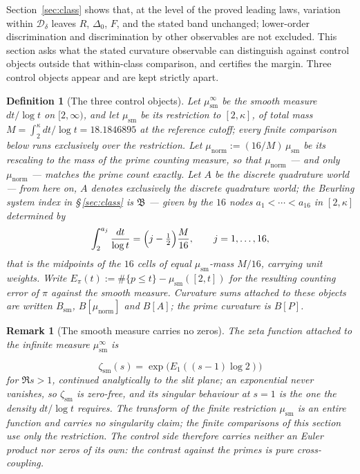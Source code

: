 \documentclass[11pt]{article}
\newtheorem{definition}[theorem]{Definition}
\newtheorem*{remark}{Remark}
\newcommand{\Dclass}{\mathcal{D}_\delta}        %
\newcommand{\Bsm}{B_{\mathrm{sm}}}              %
\begin{document}
Section~\ref{sec:class} shows that, at the level of the proved leading
laws, variation within $\Dclass$ leaves $R$, $\Delta_0$, $F$, and the
stated band unchanged; lower-order discrimination and discrimination by
other observables are not excluded. This section asks what the stated
curvature observable can distinguish against control objects outside that
within-class comparison, and certifies the margin. Three control objects appear and are
kept strictly apart.

\begin{definition}[The three control objects]
\label{def:controls}
Let $\mu_{\mathrm{sm}}^{\infty}$ be the smooth measure $dt/\log t$ on
$[2,\infty)$, and let $\mu_{\mathrm{sm}}$ be its restriction to $[2,\kappa]$,
of total mass $M=\int_2^{\kappa}dt/\log t=18.1846895$ at the reference
cutoff; every finite comparison below runs exclusively over the
restriction.
Let $\mu_{\mathrm{norm}}:=(16/M)\,\mu_{\mathrm{sm}}$ be its rescaling to the
mass of the prime counting measure, so that $\mu_{\mathrm{norm}}$ --- and only
$\mu_{\mathrm{norm}}$ --- matches the prime count exactly. Let $A$ be the
discrete quadrature world --- from here on, $A$ denotes exclusively the discrete
quadrature world; the Beurling system index in \S\,\ref{sec:class} is
$\mathfrak{B}$ --- given by the $16$ nodes $a_1<\cdots<a_{16}$ in $[2,\kappa]$
determined by
\[
\int_2^{a_j}\frac{dt}{\log t}=\Bigl(j-\tfrac12\Bigr)\frac{M}{16},
\qquad j=1,\dots,16,
\]
that is the midpoints of the $16$ cells of equal $\mu_{\mathrm{sm}}$-mass
$M/16$, carrying unit weights. Write
$E_\pi(t):=\#\{p\le t\}-\mu_{\mathrm{sm}}([2,t])$ for the resulting
\emph{counting} error of $\pi$ against the smooth measure. Curvature
sums attached to these objects are written $\Bsm$, $B[\mu_{\mathrm{norm}}]$
and $B[A]$; the prime curvature is $B[P]$.
\end{definition}

\begin{remark}[The smooth measure carries no zeros]
\label{rem:smoothzeta}
The zeta function attached to the \emph{infinite} measure
$\mu_{\mathrm{sm}}^{\infty}$ is

\[
\zeta_{\mathrm{sm}}(s)=\exp\bigl(E_1((s-1)\log 2)\bigr)
\]
 for $\Re s>1$, continued
analytically to the slit plane; an exponential never vanishes, so
$\zeta_{\mathrm{sm}}$ is zero-free, and its singular behaviour at $s=1$ is the one the density
$dt/\log t$ requires. The transform of the finite restriction
$\mu_{\mathrm{sm}}$ is an entire function and carries no singularity claim;
the finite comparisons of this section use only the restriction. The control
side therefore carries neither an Euler product nor zeros of its own: the
contrast against the primes is pure cross-coupling.
\end{remark}
\end{document}
